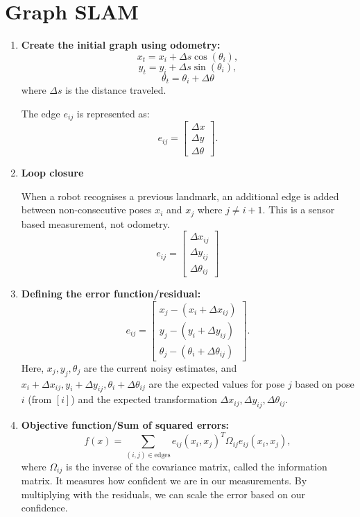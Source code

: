 \chapter{Graph SLAM}

\begin{enumerate}
    \item \textbf{Create the initial graph using odometry:}
    \[
    x_{t} = x_{i} + \Delta s \cos(\theta_{i}),
    \]
    \[
    y_{t} = y_{i} + \Delta s \sin(\theta_{i}),
    \]
    \[
    \theta_{t} = \theta_{i} + \Delta \theta
    \]
    where $\Delta s$ is the distance traveled. 
    
    The edge $e_{ij}$ is represented as:
    \[
    e_{ij} = 
    \begin{bmatrix}
        \Delta x \\
        \Delta y \\
        \Delta \theta
    \end{bmatrix}.
    \]

    \item \textbf{Loop closure}
    
    When a robot recognises a previous landmark, an additional edge is added between non-consecutive poses $x_{i}$ and $x_{j}$ where $j \neq i + 1$. This is a sensor based measurement, not odometry.
    \[
    e_{ij} = \begin{bmatrix}
        \Delta x_{ij}\\
        \Delta y_{ij}\\
        \Delta \theta_{ij}
    \end{bmatrix}
    \]

    \item \textbf{Defining the error function/residual:}
    \[
    e_{ij} = 
    \begin{bmatrix}
        x_{j} - (x_{i} + \Delta x_{ij}) \\
        y_{j} - (y_{i} + \Delta y_{ij}) \\
        \theta_{j} - (\theta_{i} + \Delta \theta_{ij})
    \end{bmatrix}.
    \]
    Here, $x_{j}, y_{j}, \theta_{j}$ are the current noisy estimates, and $x_{i} + \Delta x_{ij}, y_{i} + \Delta y_{ij}, \theta_{i} + \Delta \theta_{ij}$ are the expected values for pose $j$ based on pose $i$ (from $[i]$) and the expected transformation $\Delta x_{ij}, \Delta y_{ij}, \Delta \theta_{ij}$.

    \item \textbf{Objective function/Sum of squared errors:}
    \[
    f(x) = \sum_{(i,j) \in \text{edges}} e_{ij}(x_{i}, x_{j})^{T} \Omega_{ij} e_{ij}(x_{i}, x_{j}),
    \]
    where $\Omega_{ij}$ is the inverse of the covariance matrix, called the information matrix. It measures how confident we are in our measurements. By multiplying with the residuals, we can scale the error based on our confidence.


\end{enumerate}
